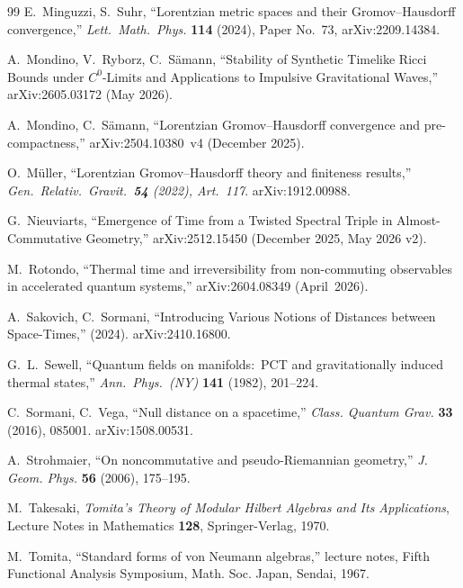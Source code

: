 \documentclass[11pt,a4paper]{article}
\theoremstyle{plain}
\theoremstyle{definition}
\begin{document}
\begin{thebibliography}{99}
E.~Minguzzi, S.~Suhr, ``Lorentzian metric spaces and their
Gromov--Hausdorff convergence,''
\emph{Lett.~Math.~Phys.} \textbf{114} (2024), Paper No.~73, arXiv:2209.14384.

A.~Mondino, V.~Ryborz, C.~S\"amann, ``Stability of Synthetic Timelike
Ricci Bounds under $C^{0}$-Limits and Applications to Impulsive
Gravitational Waves,'' arXiv:2605.03172 (May 2026).

A.~Mondino, C.~S\"amann, ``Lorentzian Gromov--Hausdorff convergence
and pre-compactness,'' arXiv:2504.10380~v4 (December 2025).

O.~M\"uller, ``Lorentzian Gromov--Hausdorff theory and finiteness
results,'' \emph{Gen.~Relativ.~Gravit.\ \textbf{54} (2022), Art.~117}. arXiv:1912.00988.

G.~Nieuviarts, ``Emergence of Time from a Twisted Spectral Triple in
Almost-Commutative Geometry,'' arXiv:2512.15450 (December 2025, May 2026 v2).

M.~Rotondo, ``Thermal time and irreversibility from non-commuting
observables in accelerated quantum systems,'' arXiv:2604.08349
(April~2026).

A.~Sakovich, C.~Sormani, ``Introducing Various Notions of Distances
between Space-Times,'' (2024). arXiv:2410.16800.

G.~L.~Sewell, ``Quantum fields on manifolds:\ PCT and gravitationally
induced thermal states,'' \emph{Ann.~Phys.~(NY)} \textbf{141} (1982),
201--224.

C.~Sormani, C.~Vega, ``Null distance on a spacetime,''
\emph{Class. Quantum Grav.} \textbf{33} (2016), 085001. arXiv:1508.00531.

A.~Strohmaier, ``On noncommutative and pseudo-Riemannian geometry,''
\emph{J. Geom. Phys.} \textbf{56} (2006), 175--195.

M.~Takesaki, \emph{Tomita's Theory of Modular Hilbert Algebras and
Its Applications}, Lecture Notes in Mathematics \textbf{128},
Springer-Verlag, 1970.

M.~Tomita, ``Standard forms of von Neumann algebras,'' lecture notes,
Fifth Functional Analysis Symposium, Math. Soc. Japan, Sendai, 1967.


\end{thebibliography}
\end{document}
